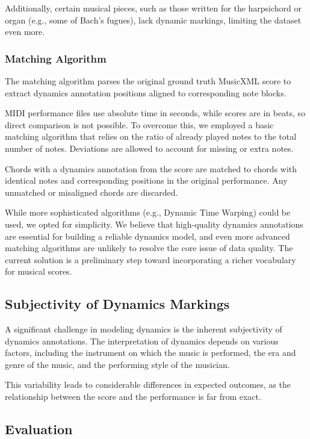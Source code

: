 Additionally, certain musical pieces, such as those written for the harpsichord or organ (e.g., some of Bach's fugues), lack dynamic markings, limiting the dataset even more.

\subsubsection{Matching Algorithm}

The matching algorithm parses the original ground truth MusicXML score to extract dynamics annotation positions aligned to corresponding note blocks.

MIDI performance files use absolute time in seconds, while scores are in beats, so direct comparison is not possible. To overcome this, we employed a basic matching algorithm that relies on the ratio of already played notes to the total number of notes. Deviations are allowed to account for missing or extra notes.

Chords with a dynamics annotation from the score are matched to chords with identical notes and corresponding positions in the original performance. Any unmatched or misaligned chords are discarded.

While more sophisticated algorithms (e.g., Dynamic Time Warping) could be used, we opted for simplicity. We believe that high-quality dynamics annotations are essential for building a reliable dynamics model, and even more advanced matching algorithms are unlikely to resolve the core issue of data quality. The current solution is a preliminary step toward incorporating a richer vocabulary for musical scores.

\subsection{Subjectivity of Dynamics Markings}

A significant challenge in modeling dynamics is the inherent subjectivity of dynamics annotations. The interpretation of dynamics depends on various factors, including the instrument on which the music is performed, the era and genre of the music, and the performing style of the musician.

This variability leads to considerable differences in expected outcomes, as the relationship between the score and the performance is far from exact.

\subsection{Evaluation}

